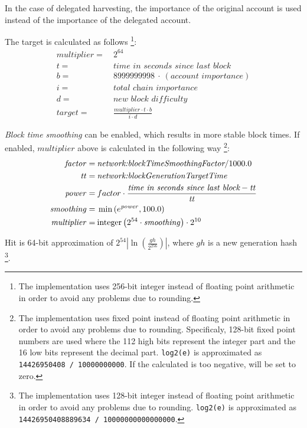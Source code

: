 In the case of delegated harvesting, the importance of the original account is used instead of the importance of the delegated account.

The target is calculated as follows
\footnote{The implementation uses 256-bit integer instead of floating point arithmetic in order to avoid any problems due to rounding.}:
\begin{align*}
\mathit{multiplier} = \: & 2^{64} \\
t = \: & \textit{time in seconds since last block} \\
b = \: & 8999999998 \: \cdot \: (\textit{account importance}) \\
i = \: & \textit{total chain importance} \\
d = \: & \textit{new block difficulty} \\
\mathit{target} = \: & \frac{multiplier \cdot t \cdot b}{i \cdot d}
\end{align*}

\emph{Block time smoothing} can be enabled, which results in more stable block times.
If enabled, $multiplier$ above is calculated in the following way
\footnote{
	The implementation uses fixed point instead of floating point arithmetic in order to avoid any problems due to rounding.
	Specificaly, 128-bit fixed point numbers are used where the 112 high bits represent the integer part and the 16 low bits represent the decimal part.
	\texttt{log2(e)} is approximated as \texttt{14426950408 / 10000000000}.
	If the calculated  is too negative,  will be set to zero.
}:
\begin{align*}
\mathit{factor} = \: & \nemsetting{network}{blockTimeSmoothingFactor} / 1000.0 \\
\mathit{tt} = \: & \nemsetting{network}{blockGenerationTargetTime} \\
\mathit{power} = \: & factor \cdot \frac{\textit{time in seconds since last block} - \mathit{tt}}{\mathit{tt}} \\
\mathit{smoothing} = \: & \min\left(e^{\mathit{power}}, 100.0\right) \\
\mathit{multiplier} = \: & \mathfunc{integer}\left(2^{54} \cdot \mathit{smoothing}\right) \cdot 2^{10}
\end{align*}

Hit is 64-bit approximation of $2^{54} \left|\ln\left(\frac{\mathit{gh}}{2^{256}}\right)\right|$, where $\mathit{gh}$ is a new generation hash
\footnote{
	The implementation uses 128-bit integer instead of floating point arithmetic in order to avoid any problems due to rounding.
	\texttt{log2(e)} is approximated as \texttt{14426950408889634 / 10000000000000000}.
}.

